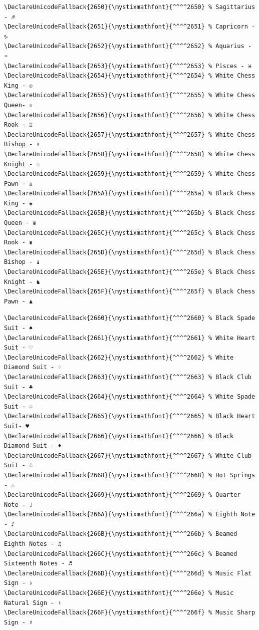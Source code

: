 \documentclass[12pt, twoside]{article}
\begin{document}
\newpage
\begin{verbatim}
\DeclareUnicodeFallback{2650}{\mystixmathfont}{^^^^2650} % Sagittarius - ♐
\DeclareUnicodeFallback{2651}{\mystixmathfont}{^^^^2651} % Capricorn - ♑
\DeclareUnicodeFallback{2652}{\mystixmathfont}{^^^^2652} % Aquarius - ♒
\DeclareUnicodeFallback{2653}{\mystixmathfont}{^^^^2653} % Pisces - ♓
\DeclareUnicodeFallback{2654}{\mystixmathfont}{^^^^2654} % White Chess King - ♔
\DeclareUnicodeFallback{2655}{\mystixmathfont}{^^^^2655} % White Chess Queen- ♕
\DeclareUnicodeFallback{2656}{\mystixmathfont}{^^^^2656} % White Chess Rook - ♖
\DeclareUnicodeFallback{2657}{\mystixmathfont}{^^^^2657} % White Chess Bishop - ♗
\DeclareUnicodeFallback{2658}{\mystixmathfont}{^^^^2658} % White Chess Knight - ♘
\DeclareUnicodeFallback{2659}{\mystixmathfont}{^^^^2659} % White Chess Pawn - ♙
\DeclareUnicodeFallback{265A}{\mystixmathfont}{^^^^265a} % Black Chess King - ♚
\DeclareUnicodeFallback{265B}{\mystixmathfont}{^^^^265b} % Black Chess Queen - ♛
\DeclareUnicodeFallback{265C}{\mystixmathfont}{^^^^265c} % Black Chess Rook - ♜
\DeclareUnicodeFallback{265D}{\mystixmathfont}{^^^^265d} % Black Chess Bishop - ♝
\DeclareUnicodeFallback{265E}{\mystixmathfont}{^^^^265e} % Black Chess Knight - ♞
\DeclareUnicodeFallback{265F}{\mystixmathfont}{^^^^265f} % Black Chess Pawn - ♟

\end{verbatim}
\newpage
\begin{verbatim}
\DeclareUnicodeFallback{2660}{\mystixmathfont}{^^^^2660} % Black Spade Suit - ♠
\DeclareUnicodeFallback{2661}{\mystixmathfont}{^^^^2661} % White Heart Suit - ♡
\DeclareUnicodeFallback{2662}{\mystixmathfont}{^^^^2662} % White Diamond Suit - ♢
\DeclareUnicodeFallback{2663}{\mystixmathfont}{^^^^2663} % Black Club Suit - ♣
\DeclareUnicodeFallback{2664}{\mystixmathfont}{^^^^2664} % White Spade Suit - ♤
\DeclareUnicodeFallback{2665}{\mystixmathfont}{^^^^2665} % Black Heart Suit- ♥
\DeclareUnicodeFallback{2666}{\mystixmathfont}{^^^^2666} % Black Diamond Suit - ♦
\DeclareUnicodeFallback{2667}{\mystixmathfont}{^^^^2667} % White Club Suit - ♧
\DeclareUnicodeFallback{2668}{\mystixmathfont}{^^^^2668} % Hot Springs - ♨
\DeclareUnicodeFallback{2669}{\mystixmathfont}{^^^^2669} % Quarter Note - ♩
\DeclareUnicodeFallback{266A}{\mystixmathfont}{^^^^266a} % Eighth Note - ♪
\DeclareUnicodeFallback{266B}{\mystixmathfont}{^^^^266b} % Beamed Eighth Notes - ♫
\DeclareUnicodeFallback{266C}{\mystixmathfont}{^^^^266c} % Beamed Sixteenth Notes - ♬
\DeclareUnicodeFallback{266D}{\mystixmathfont}{^^^^266d} % Music Flat Sign - ♭
\DeclareUnicodeFallback{266E}{\mystixmathfont}{^^^^266e} % Music Natural Sign - ♮
\DeclareUnicodeFallback{266F}{\mystixmathfont}{^^^^266f} % Music Sharp Sign - ♯

\end{verbatim}
\end{document}
